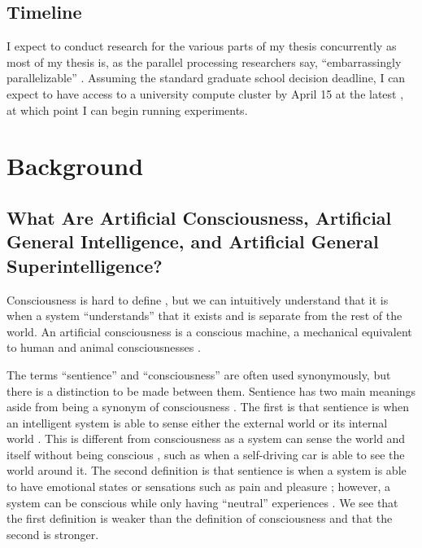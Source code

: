 \documentclass[12pt]{report}
\begin{document}
\section{Timeline}

I expect to conduct research for the various parts of my thesis concurrently as most of my thesis is, as the parallel processing researchers say, \enquote{embarrassingly parallelizable} \cite{Vrajitoru_undated-xc}.
Assuming the standard graduate school decision deadline, I can expect to have access to a university compute cluster by April 15 at the latest \cite{Council_of_Graduate_Schools2021-qf}, at which point I can begin running experiments.

\chapter{Background}

\section{What Are Artificial Consciousness, Artificial General Intelligence, and Artificial General Superintelligence?}

Consciousness is hard to define \cite{Butlin2023-jm}, but we can intuitively understand that it is when a system \enquote{understands} that it exists and is separate from the rest of the world.
An artificial consciousness is a conscious machine, a mechanical equivalent to human and animal consciousnesses \cite{Butlin2023-jm}.

The terms \enquote{sentience} and \enquote{consciousness} are often used synonymously, but there is a distinction to be made between them.
Sentience has two main meanings aside from being a synonym of consciousness \cite{Butlin2023-jm}.
The first is that sentience is when an intelligent system is able to sense either the external world or its internal world \cite{Butlin2023-jm}.
This is different from consciousness as a system can sense the world and itself without being conscious \cite{Butlin2023-jm}, such as when a self-driving car is able to see the world around it.
The second definition is that sentience is when a system is able to have emotional states or sensations such as pain and pleasure \cite{Butlin2023-jm}; however, a system can be conscious while only having \enquote{neutral} experiences \cite{Butlin2023-jm}.
We see that the first definition is weaker than the definition of consciousness and that the second is stronger.
\end{document}
